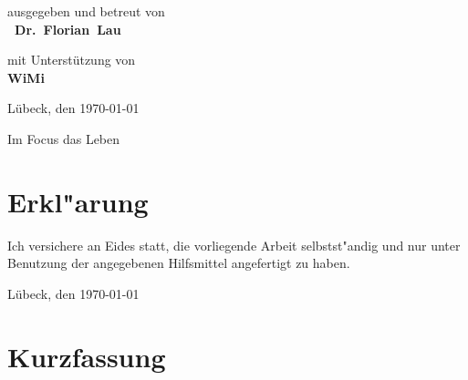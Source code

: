 \documentclass[
	ngerman,
	11pt,
	twoside,
	a4paper,
	headsepline,
	footsepline, 
	toc=bib
]{scrbook}
\begin{document}
\begin{titlepage}
{	\titlepageskip
	ausgegeben und betreut von\\
	\textbf{~Dr.~Florian~Lau}

	\titlepageskip
	{
		mit Unterstützung von\\
		\textbf{WiMi}\\
	}


	\vfill
	{
		Lübeck, den \today
	}

	{
		\titlepageskip
		Im Focus das Leben
	}
}
\end{titlepage}
\restoregeometry

\cleardoublepage

\newpage
\chapter*{Erkl"arung}

Ich versichere an Eides statt, die vorliegende Arbeit selbstst"andig und nur unter Benutzung
der angegebenen Hilfsmittel angefertigt zu haben.

\vspace*{3cm}
Lübeck, den \today

\thispagestyle{empty}
\cleardoublepage



\chapter*{Kurzfassung}
\end{document}
